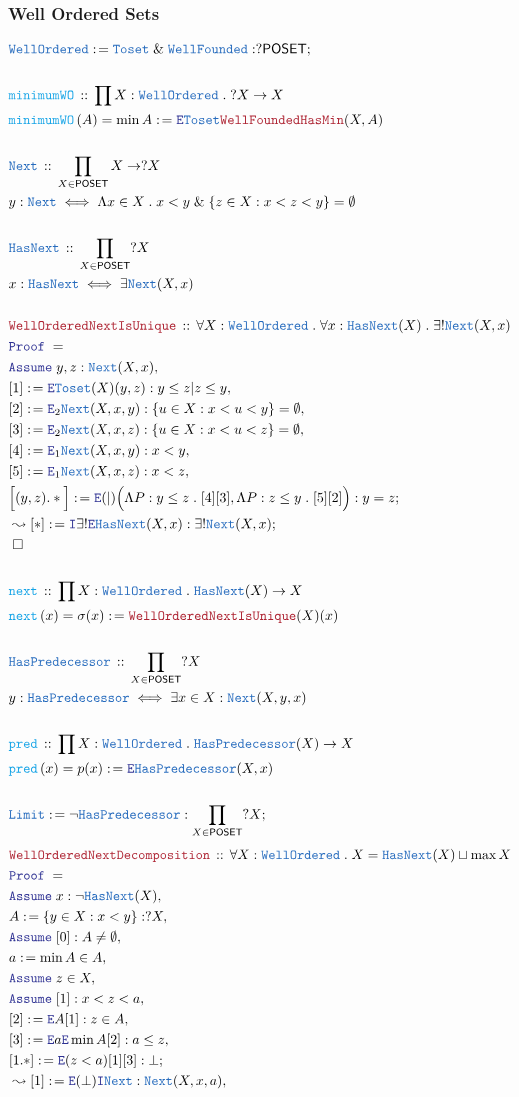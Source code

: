 \documentclass[12pt]{scrartcl}
\newcommand{\TYPE}[1]{\textcolor{NavyBlue}{\mathtt{#1}}}
\newcommand{\FUNC}[1]{\textcolor{Cerulean}{\mathtt{#1}}}
\newcommand{\LOGIC}[1]{\textcolor{Blue}{\mathtt{#1}}}
\newcommand{\THM}[1]{\textcolor{Maroon}{\mathtt{#1}}}
\renewcommand{\.}{\; . \;}
\newcommand{\de}{: \kern 0.1pc =}
\newcommand{\Act}[1]{\left( #1 \right)}
\newcommand{\Theorem}[2]{& \THM{#1} \, :: \, #2 \\ & \Proof = \\ }
\newcommand{\DeclareType}[2]{& \TYPE{#1} \, :: \, #2 \\}
\newcommand{\DefineType}[3]{& #1 : \TYPE{#2} \iff #3 \\}
\newcommand{\DeclareFunc}[2]{& \FUNC{#1} \, :: \, #2 \\}
\newcommand{\DefineNamedFunc}[4]{&  \FUNC{#1}\Act{#2} = #3 \de #4 \\}
\newcommand{\Page}[1]{ \begin{align*} #1 \end{align*}   }
\renewcommand{\And}{\; \& \;}
\newcommand{\Intro}{\LOGIC{I}}
\newcommand{\Elim}{\LOGIC{E}}
\newcommand{\Say}[3]{& #1 \de #2 : #3, \\}
\newcommand{\SayIn}[3]{& #1 \de #2 \in #3, \\}
\newcommand{\Conclude}[3]{& #1 \de #2 : #3; \\}
\newcommand{\Derive}[3]{& \leadsto #1 \de #2 : #3, \\}
\newcommand{\DeriveConclude}[3]{& \leadsto #1 \de #2 : #3 ; \\}
\newcommand{\Assume}[2]{& \LOGIC{Assume} \; #1 : #2, \\}
\newcommand{\AssumeIn}[2]{& \LOGIC{Assume} \; #1 \in #2, \\}
\newcommand{\QED}{\; \square}
\newcommand{\EndProof}{& \QED \\}
\newcommand{\Proof}{\LOGIC{Proof} \; }
\newcommand{\Toset}{\TYPE{Toset}}
\newcommand{\WF}{\TYPE{WellFounded}}
\newcommand{\WO}{\TYPE{WellOrdered}}
\newcommand{\POSET}{\mathsf{POSET}}
\begin{document}
\subsubsection{Well Ordered Sets}
\Page{
	\Conclude{\WO}{\Toset \And \WF}{?\POSET}
	\\
	\DeclareFunc{minimumWO}{\prod X : \WO \. ?X \to X}
	\DefineNamedFunc{minimumWO}{A}{\min A}{\Elim \Toset \THM{WellFoundedHasMin} (X,A)}
	\\
	\DeclareType{Next}{\prod_{X \in \POSET} X \to ?X}
	\DefineType{y}{Next}
	{
		\Lambda x \in X \. 
		x < y \And \{ z \in X : x < z < y\} = \emptyset
	}
	\\
	\DeclareType{HasNext}{\prod_{X \in \POSET}  ?X}
	\DefineType{x}{HasNext}{\exists \TYPE{Next}(X,x) }
	\\
	\Theorem{WellOrderedNextIsUnique}
	{
		\forall X : \WO \.
		\forall x : \TYPE{HasNext}(X) \.
		\exists! \TYPE{Next}(X,x) 
	}
	\Assume{y,z}{\TYPE{Next}(X,x)}
	\Say{[1]}{\Elim \TYPE{Toset}(X)(y,z)}{y \le z | z \le y}
	\Say{[2]}{\Elim_2 \TYPE{Next}(X,x,y)}{  \{ u \in X : x < u < y\} = \emptyset }
	\Say{[3]}{\Elim_2 \TYPE{Next}(X,x,z)}{  \{ u \in X : x < u < z\} = \emptyset }
	\Say{[4]}{\Elim_1 \TYPE{Next}(X,x,y)}{ x < y } 
	\Say{[5]}{\Elim_1 \TYPE{Next}(X,x,z)}{ x < z }
	\Conclude{\Big[(y,z).*\Big]}{\Elim(|)\Big( \Lambda P : y \le z \. [4][3], \Lambda P : z \le y \. [5][2] \Big)}
	{
		y = z
	}
	\DeriveConclude{[*]}{\Intro \exists! \Elim \TYPE{HasNext}(X,x)}{\exists! \TYPE{Next}(X,x)}
	\EndProof
	\\
	\DeclareFunc{next}{\prod X : \WO \. \TYPE{HasNext}(X) \to X}
	\DefineNamedFunc{next}{x}{\sigma(x)}{\THM{WellOrderedNextIsUnique}(X)(x)}
	\\
	\DeclareType{HasPredecessor}{\prod_{X \in \POSET} ?X}
	\DefineType{y}{HasPredecessor}{\exists x \in X : \TYPE{Next}(X,y,x)}
	\\
	\DeclareFunc{pred}{\prod X : \WO \. \TYPE{HasPredecessor}(X) \to X}
	\DefineNamedFunc{pred}{x}{p(x)}{\Elim \TYPE{HasPredecessor}(X,x)}
	\\
	\Conclude{\TYPE{Limit}}{\neg \TYPE{HasPredecessor}}{\prod_{X\in \POSET} ?X}
}\Page{
	\Theorem{WellOrderedNextDecomposition}
	{
		\forall X : \WO \. 
		X = \TYPE{HasNext}(X) \sqcup \max X
	}
	\Assume{x}{\neg \TYPE{HasNext}(X)}
	\Say{A}{\{ y \in X : x < y\} }{?X}
	\Assume{[0]}{A \neq \emptyset}
	\SayIn{a}{\min A}{A}
	\AssumeIn{z}{X}
	\Assume{[1]}{x < z < a}
	\Say{[2]}{\Elim A [1]}{z \in A}
	\Say{[3]}{\Elim a \Elim  \min A [2]}{a \le z}
	\Conclude{[1.*]}{\Elim (z < a)[1][3]}{\bot}
	\Derive{[1]}{\Elim(\bot)\Intro\TYPE{Next}}{ \TYPE{Next}(X,x,a)}
}
\end{document}
